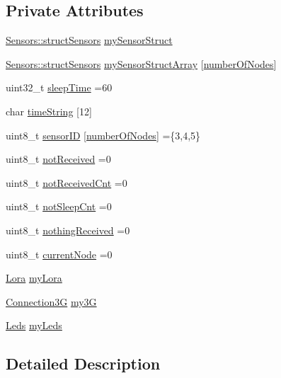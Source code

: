 \subsection*{Private Attributes}
\begin{DoxyCompactItemize}
\item 
\hyperlink{struct_sensors_1_1struct_sensors}{Sensors\+::struct\+Sensors} \hyperlink{class_gateway_a270aad0f50decd3f5140f4e1cdab5c52}{my\+Sensor\+Struct}
\item 
\hyperlink{struct_sensors_1_1struct_sensors}{Sensors\+::struct\+Sensors} \hyperlink{class_gateway_ae95c6b223c4c3d759f5594cec3283b69}{my\+Sensor\+Struct\+Array} \mbox{[}\hyperlink{_constants_8h_a70e76791a9cc76a4ac1d07222d9d0e32}{number\+Of\+Nodes}\mbox{]}
\item 
uint32\+\_\+t \hyperlink{class_gateway_abad37ae0964cf2a1913f616888a74df1}{sleep\+Time} =60
\item 
char \hyperlink{class_gateway_a7e3225e6afd4360659530bf39baa67e1}{time\+String} \mbox{[}12\mbox{]}
\item 
uint8\+\_\+t \hyperlink{class_gateway_a908079e6afe54a56c710b6ba5a3af7ad}{sensor\+ID} \mbox{[}\hyperlink{_constants_8h_a70e76791a9cc76a4ac1d07222d9d0e32}{number\+Of\+Nodes}\mbox{]} =\{3,4,5\}
\item 
uint8\+\_\+t \hyperlink{class_gateway_a97308149e6ad1ba165624c6eef3df761}{not\+Received} =0
\item 
uint8\+\_\+t \hyperlink{class_gateway_ae486953d1dbc8811b3438f64f2e940ec}{not\+Received\+Cnt} =0
\item 
uint8\+\_\+t \hyperlink{class_gateway_a22eff85e24fa38ad576f72aaa27c23d7}{not\+Sleep\+Cnt} =0
\item 
uint8\+\_\+t \hyperlink{class_gateway_aeb1b88db56322530fa14d814b065c512}{nothing\+Received} =0
\item 
uint8\+\_\+t \hyperlink{class_gateway_aedf1d6a042a5558fbc40197275d1591e}{current\+Node} =0
\item 
\hyperlink{class_lora}{Lora} \hyperlink{class_gateway_a3665047d9fe3f4beb5fbb172a33873a3}{my\+Lora}
\item 
\hyperlink{class_connection3_g}{Connection3G} \hyperlink{class_gateway_a1a8fea5745d4519cfeb681135372dcb3}{my3G}
\item 
\hyperlink{class_leds}{Leds} \hyperlink{class_gateway_adda10328b9e799d16a456008ca50caa8}{my\+Leds}
\end{DoxyCompactItemize}


\subsection{Detailed Description}


